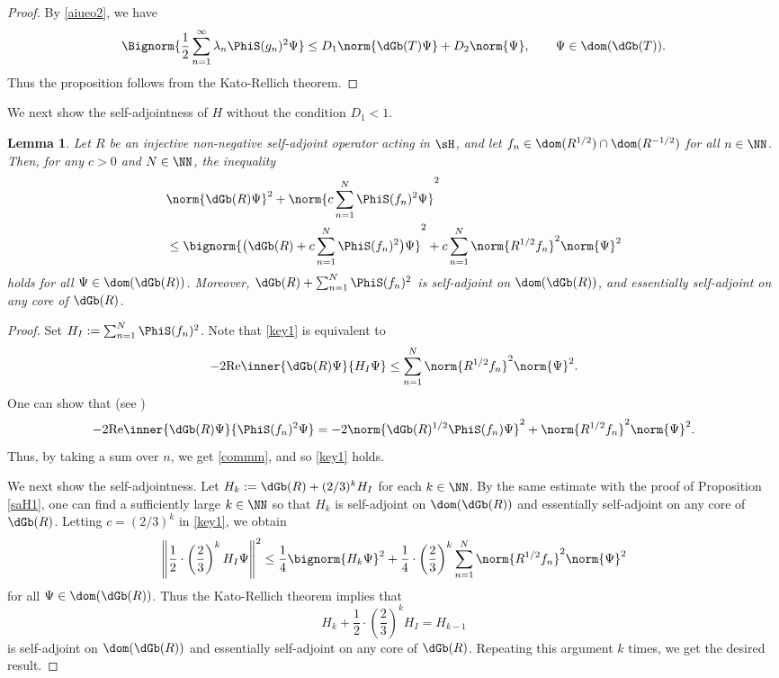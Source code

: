 \documentclass[12pt]{article}
\theoremstyle{plain}
\newtheorem{lem}[theorem]{\bf Lemma}
\numberwithin{equation}{section}
\theoremstyle{remark}
\begin{document}
\begin{proof}
  By \eqref{aiueo2}, we have
\begin{align*}
 \Bignorm{\frac{1}{2}\sum_{n=1}^\infty\lambda_n\PhiS(g_n)^2\Psi}
 \leq D_1 \norm{\dGb(T)\Psi} + D_2\norm{\Psi}, \qquad \Psi\in\dom(\dGb(T)).
\end{align*}
Thus the proposition follows from the Kato-Rellich theorem.
\end{proof}

We next show the self-adjointness of $H$ without the condition $D_1<1$.

\begin{lem}{\label{saH2}}
 Let $R$ be an injective non-negative self-adjoint operator acting in $\sH$, 
and let $f_n\in\dom(R^{1/2})\cap \dom(R^{-1/2})$ for all $n\in\NN$.
Then, for any $c>0$ and $N\in\NN$, the inequality
\begin{align}
& \norm{\dGb(R)\Psi}^2 +  \norm{c\sum_{n=1}^N \PhiS(f_n)^2\Psi}^2  \notag \\
& \leq  \bignorm{\big(\dGb(R) + c\sum_{n=1}^N \PhiS(f_n)^2 \big)\Psi}^2 + c\sum_{n=1}^N\norm{R^{1/2}f_n}^2\norm{\Psi}^2 \label{key1}
\end{align}
holds for all $\Psi\in\dom(\dGb(R))$. 
Moreover, $\dGb(R)+\sum_{n=1}^N\PhiS(f_n)^2$ is self-adjoint on $\dom(\dGb(R))$,
and essentially self-adjoint on any core of $\dGb(R)$.
\end{lem}

\begin{proof}
Set $H_I := \sum_{n=1}^N\PhiS(f_n)^2$. Note that \eqref{key1} is equivalent to
\begin{align}
 -2\mathrm{Re} \inner{\dGb(R)\Psi}{H_I\Psi} 
 \leq \sum_{n=1}^N \norm{R^{1/2}f_n}^2 \norm{\Psi}^2. \label{commm}
\end{align}
One can show that (see \cite[Proposition 3.4]{ms05})
\begin{equation}\label{miyaosasaki}
  -2\mathrm{Re}\inner{\dGb(R)\Psi}{\PhiS(f_n)^2\Psi}
 = -2\norm{\dGb(R)^{1/2}\PhiS(f_n)\Psi}^2 + \norm{R^{1/2}f_n}^2\norm{\Psi}^2.
\end{equation}
Thus, by taking a sum over $n$, we get \eqref{commm}, and so \eqref{key1} holds.

We next show the self-adjointness.
Let $H_k:=\dGb(R)+(2/3)^k H_I$ for each $k\in\NN$.
By the same estimate with the proof of Proposition \ref{saH1}, one can find a sufficiently large $k\in\NN$ so that
$H_k$ is self-adjoint on $\dom(\dGb(R))$ and essentially self-adjoint on any core of $\dGb(R)$.
Letting $c=(2/3)^k$ in \eqref{key1}, we obtain
\[
\left\|\frac{1}{2}\cdot\left(\frac{2}{3}\right)^kH_I\Psi\right\|^2
 \leq  \frac{1}{4}\bignorm{H_k\Psi}^2 + \frac{1}{4}\cdot\left(\frac{2}{3}\right)^k\sum_{n=1}^N\norm{R^{1/2}f_n}^2\norm{\Psi}^2
\]
for all $\Psi\in\dom(\dGb(R))$.
Thus the Kato-Rellich theorem implies that 
\[
H_k+\frac{1}{2}\cdot\left(\frac{2}{3}\right)^kH_I = H_{k-1}
\]
is self-adjoint on $\dom(\dGb(R))$ and essentially self-adjoint on any core of $\dGb(R)$.
Repeating this argument $k$ times, we get the desired result.
\end{proof}
\end{document}
